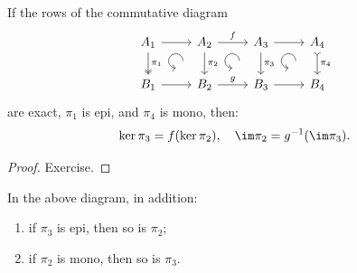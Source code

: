 \begin{lem}[4-lemma]
    If the rows of the commutative diagram
    \[\begin{tikzcd}[every matrix/.append style={name=m},   
        execute at end picture={\draw [<-] ([xshift=-8mm,yshift=-10mm]m-1-2.north) arc[start angle=-90,delta angle=-270,radius=0.2cm];
        \draw [<-] ([xshift=-8mm,yshift=-10mm]m-1-3.north) arc[start angle=-90,delta angle=-270,radius=0.2cm];
        \draw [<-] ([xshift=-8mm,yshift=-10mm]m-1-4.north) arc[start angle=-90,delta angle=-270,radius=0.2cm];}]
        A_1\arrow[r]\arrow[d,two heads,"\pi_1"] & A_2\arrow[r,"f"]\arrow[d,"\pi_2"] & A_3 \arrow[r]\arrow[d,"\pi_3"] & A_4\arrow[d,tail,"\pi_4"] \\
       B_1\arrow[r] & B_2\arrow[r,"g"] & B_3\arrow[r] &B_4
    \end{tikzcd}\]
    are exact, $\pi_1$ is epi, and $\pi_4$ is mono, then:
    \[\ker\pi_3=f(\ker\pi_2),\quad \im\pi_2=g^{-1}(\im \pi_3).\]
\end{lem}
\begin{proof}
    Exercise.
\end{proof}
\begin{cor}
    In the above diagram, in addition:
    \begin{enumerate}
        \item if $\pi_3$ is epi, then so is $\pi_2$;
        \item if $\pi_2$ is mono, then so is $\pi_3$.
    \end{enumerate}
\end{cor}

